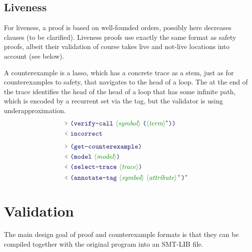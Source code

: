 \documentclass[runningheads]{llncs}
\begin{document}
\subsection{Liveness}

For liveness, a proof is based on well-founded orders,
possibly here decreases clauses (to be clarified).
Liveness proofs use exactly the same format as safety proofs,
albeit their validation of course takes live and not-live locations into account
(see below).

A counterexample is a lasso,
which has a concrete trace as a stem, just as for counterexamples to safety,
that navigates to the head of a loop.
The  at the end of the trace
identifies the head of the head of a loop that has some infinite path,
which is encoded by a recurrent set via the  tag,
but the validator is using underapproximation.
\begin{align*}
\QRY~ & \LP \terminal{verify-call}~
            \nonterminal{symbol}~
            \LP \nonterminal{term}\rstar \RP
        \RP \notag \\
\RES~ & \terminal{incorrect} \\[4pt]
\QRY~ & \LP \terminal{get-counterexample} \RP \\
\RES~ & \LP \terminal{model}~  \nonterminal{model} \RP \\
\RES~ & \LP \terminal{select-trace}~  \nonterminal{trace} \RP \\
\RES~ & \LP \terminal{annotate-tag}~
           \nonterminal{symbol}~
           \nonterminal{attribute}\rplus
                 \RP \rstar
\end{align*}

% 

\section{Validation}

The main design goal of proof and counterexample formats is
that they can be compiled together with the original program
into an SMT-LIB file.
\end{document}
